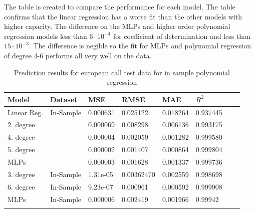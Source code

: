 The table is created to compare the performance for each model. The table confirms that the linear regression has a worse fit than the other models with higher capacity. The difference on the MLPs and higher order polynomial regression models less than $6\cdot 10^{-4}$ for coefficient of determination and less than $15 \cdot 10^{-3}$. The difference is negible so the fit for MLPs and polynomial regression of degree 4-6 performs all very well on the data.

\begin{table}[th]
\caption{Prediction results for european call test data for in sample polynomial regression}
\label{tab:euroPerformance}
\centering
\begin{tabular}{l l l l l l l l }
\toprule
\textbf{Model} & \textbf{Dataset} & \textbf{MSE} & \textbf{RMSE} & \textbf{MAE} & \textbf{$R^2$} \\
\midrule
Linear Reg. & In-Sample & 0.000631 & 0.025122 & 0.018264 & 0.937445\\
2. degree &  & 0.000069 & 0.008298 & 0.006136 & 0.993175\\
4. degree &  & 0.000004 & 0.002059 & 0.001282 & 0.999580\\
5. degree &  & 0.000002 & 0.001407 & 0.000864 & 0.999804\\
MLPs &  & 0.000003 & 0.001628 & 0.001337 & 0.999736\\
3. degree & In-Sample & 1.31e-05 & 0.00362470 & 0.002559 & 0.998698\\
6. degree & In-Sample & 9.23e-07 & 0.000961 & 0.000592 & 0.999908\\
MLPs & In-Sample & 0.000006 & 0.002419 & 0.001966 & 0.99942\\
\bottomrule\\
\end{tabular}
\end{table}

